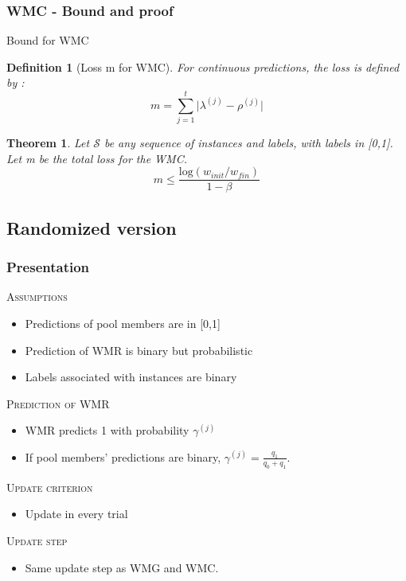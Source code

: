 \documentclass{beamer}
\newtheorem{Th}{Theorem}
\newtheorem{Def}{Definition}
\begin{document}
			\subsubsection*{WMC - Bound and proof}

\begin{frame}{Bound for WMC}

\begin{Def}[Loss m  for WMC]
For continuous predictions, the loss is defined by :
\[m = \sum_{j=1}^{t}\lvert\lambda^{(j)} - \rho^{(j)}\rvert\]
\end{Def}

\begin{Th}
Let $\mathcal{S}$ be any sequence of instances and labels, with labels in [0,1]. Let m be the total  loss for the WMC.
\[m\leq\frac{\mathrm{log}(w_{init}/w_{fin})}{1-\beta}\]
\end{Th}

\end{frame}

		
		\subsection{Randomized version}
			\subsubsection*{Presentation}

\begin{frame}

\textsc{Assumptions}
\begin{itemize}
\item Predictions of pool members are in [0,1]
\item Prediction of WMR is binary but probabilistic
\item Labels associated with instances are binary\newline
\end{itemize}

\textsc{Prediction of WMR}
\begin{itemize}
\item WMR predicts 1 with probability $\gamma^{(j)}$
\item If pool members' predictions are binary, $\gamma^{(j)} = \frac{q_1}{q_0+q_1}$.\newline
\end{itemize}

\textsc{Update criterion}
\begin{itemize}
\item Update in every trial\newline
\end{itemize}

\textsc{Update step}
\begin{itemize}
\item Same update step as WMG and WMC.
\end{itemize}

\end{frame}
\end{document}
